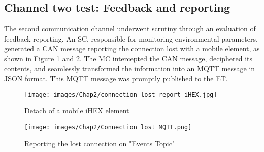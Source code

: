 \subsection{Channel two test: Feedback and reporting}
The second communication channel underwent scrutiny through an evaluation of feedback reporting. An SC, responsible for monitoring environmental parameters, generated a CAN message reporting the connection lost with a mobile element, as shown in Figure \ref{Detach mobile element} and \ref{Detach mobile element MQTT}. The MC intercepted the CAN message, deciphered its contents, and seamlessly transformed the information into an MQTT message in JSON format. This MQTT message was promptly published to the ET.

\begin{figure}[H]
\begin{center}
\texttt{[image: images/Chap2/connection lost report iHEX.jpg]}\\
\caption{Detach of a mobile iHEX element}
\label{Detach mobile element}
\end{center}
\end{figure}

\begin{figure}[H]
\begin{center}
\texttt{[image: images/Chap2/Connection lost MQTT.png]}\\
\caption{Reporting the lost connection on "Events Topic"}
\label{Detach mobile element MQTT}
\end{center}
\end{figure}

